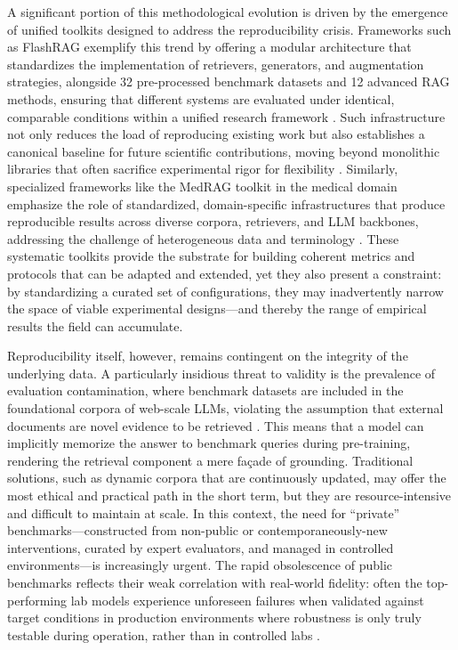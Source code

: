 \documentclass[11pt,a4paper]{article}
\begin{document}
A significant portion of this methodological evolution is driven by the emergence of unified toolkits designed to address the reproducibility crisis. Frameworks such as FlashRAG exemplify this trend by offering a modular architecture that standardizes the implementation of retrievers, generators, and augmentation strategies, alongside 32 pre-processed benchmark datasets and 12 advanced RAG methods, ensuring that different systems are evaluated under identical, comparable conditions within a unified research framework \cite{arxiv:2405.13576v1}. Such infrastructure not only reduces the load of reproducing existing work but also establishes a canonical baseline for future scientific contributions, moving beyond monolithic libraries that often sacrifice experimental rigor for flexibility \cite{arxiv:2405.13576v1}. Similarly, specialized frameworks like the MedRAG toolkit in the medical domain emphasize the role of standardized, domain-specific infrastructures that produce reproducible results across diverse corpora, retrievers, and LLM backbones, addressing the challenge of heterogeneous data and terminology \cite{arxiv:2402.13178v2}. These systematic toolkits provide the substrate for building coherent metrics and protocols that can be adapted and extended, yet they also present a constraint: by standardizing a curated set of configurations, they may inadvertently narrow the space of viable experimental designs---and thereby the range of empirical results the field can accumulate.

Reproducibility itself, however, remains contingent on the integrity of the underlying data. A particularly insidious threat to validity is the prevalence of evaluation contamination, where benchmark datasets are included in the foundational corpora of web-scale LLMs, violating the assumption that external documents are novel evidence to be retrieved \cite{arxiv:2312.10997v5}. This means that a model can implicitly memorize the answer to benchmark queries during pre-training, rendering the retrieval component a mere fa\c{c}ade of grounding. Traditional solutions, such as dynamic corpora that are continuously updated, may offer the most ethical and practical path in the short term, but they are resource-intensive and difficult to maintain at scale. In this context, the need for ``private'' benchmarks---constructed from non-public or contemporaneously-new interventions, curated by expert evaluators, and managed in controlled environments---is increasingly urgent. The rapid obsolescence of public benchmarks reflects their weak correlation with real-world fidelity: often the top-performing lab models experience unforeseen failures when validated against target conditions in production environments where robustness is only truly testable during operation, rather than in controlled labs \cite{arxiv:2401.05856v1}.
\end{document}
